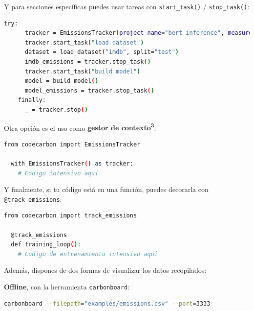 \documentclass[12pt,a4paper]{report}
\begin{document}
Y para secciones específicas puedes usar tareas con \texttt{start\_task()} /
\texttt{stop\_task()}:

\begin{tcolorbox}[colback=codebackground, colframe=codeborder, boxrule=0.8pt, arc=0mm, boxsep=5pt, left=5pt, right=5pt, top=5pt, bottom=5pt]
  \begin{lstlisting}[language=bash]
    try:
      tracker = EmissionsTracker(project_name="bert_inference", measure_power_secs=10)
      tracker.start_task("load dataset")
      dataset = load_dataset("imdb", split="test")
      imdb_emissions = tracker.stop_task()
      tracker.start_task("build model")
      model = build_model()
      model_emissions = tracker.stop_task()
    finally:
      _ = tracker.stop()
  \end{lstlisting}
\end{tcolorbox}

Otra opción es el uso como \textbf{gestor de contexto\textsuperscript{3}}:

\begin{tcolorbox}[colback=codebackground, colframe=codeborder, boxrule=0.8pt, arc=0mm, boxsep=5pt, left=5pt, right=5pt, top=5pt, bottom=5pt]
  \begin{lstlisting}[language=bash]
  from codecarbon import EmissionsTracker

  with EmissionsTracker() as tracker:
    # Codigo intensivo aqui
  \end{lstlisting}
\end{tcolorbox}

Y finalmente, si tu código está en una función, puedes decorarla con
\texttt{@track\_emissions}:

\begin{tcolorbox}[colback=codebackground, colframe=codeborder, boxrule=0.8pt, arc=0mm, boxsep=5pt, left=5pt, right=5pt, top=5pt, bottom=5pt]
  \begin{lstlisting}[language=bash]
  from codecarbon import track_emissions

  @track_emissions
  def training_loop():
    # Codigo de entrenamiento intensivo aqui
  \end{lstlisting}
\end{tcolorbox}

Además, dispones de dos formas de visualizar los datos recopilados:

\textbf{Offline}, con la herramienta \texttt{carbonboard}:

\begin{tcolorbox}[colback=codebackground, colframe=codeborder, boxrule=0.8pt, arc=0mm, boxsep=5pt, left=5pt, right=5pt, top=5pt, bottom=5pt]
  \begin{lstlisting}[language=bash]
  carbonboard --filepath="examples/emissions.csv" --port=3333
  \end{lstlisting}
\end{tcolorbox}
\end{document}
